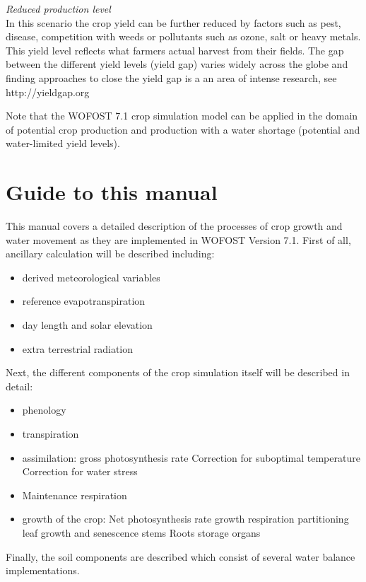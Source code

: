 {\it Reduced production level\/}\\
In this scenario the crop yield can be further reduced by factors such as pest, disease, competition with weeds
or pollutants such as ozone, salt or heavy metals. This yield level reflects what farmers actual
harvest from their fields. The gap between the different yield levels (yield gap) varies widely
across the globe and finding approaches to close the yield gap is a an area of intense research,
see http://yieldgap.org

Note that the WOFOST 7.1 crop simulation model can be applied in the domain of potential crop
production and production with a water shortage (potential and water-limited yield levels). 

\section{Guide to this manual}

This manual covers a detailed description of the processes of crop growth and water movement as they are
implemented in WOFOST Version 7.1. First of all, ancillary calculation will be described including:
\begin{itemize}
	\item derived meteorological variables
	\item reference evapotranspiration
	\item day length and solar elevation
	\item extra terrestrial radiation
\end{itemize}

Next, the different components of the crop simulation itself will be described in detail:
\begin{itemize}
	\item phenology
	\item transpiration
	\item assimilation:
	\subitem gross photosynthesis rate
	\subitem Correction for suboptimal temperature
	\subitem Correction for water stress
	\item Maintenance respiration
	\item growth of the crop:
	\subitem Net photosynthesis rate
	\subitem growth respiration
	\subitem partitioning
	\subitem leaf growth and senescence 
	\subitem stems
	\subitem Roots
	\subitem storage organs	
\end{itemize}

Finally, the soil components are described which consist of several water balance implementations.